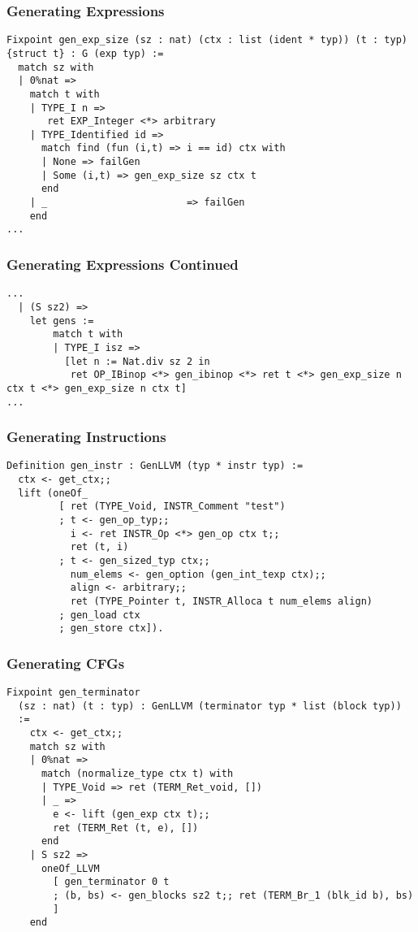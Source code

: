 \documentclass{beamer}
\begin{document}
\begin{frame}
  \frametitle{Generating Expressions}

\begin{lstlisting}[language=SSR]
Fixpoint gen_exp_size (sz : nat) (ctx : list (ident * typ)) (t : typ) {struct t} : G (exp typ) :=
  match sz with
  | 0%nat =>
    match t with
    | TYPE_I n =>
       ret EXP_Integer <*> arbitrary
    | TYPE_Identified id =>
      match find (fun (i,t) => i == id) ctx with
      | None => failGen
      | Some (i,t) => gen_exp_size sz ctx t
      end
    | _                        => failGen
    end
...
\end{lstlisting}
\end{frame}

\begin{frame}
  \frametitle{Generating Expressions Continued}
\begin{lstlisting}[language=SSR]
...
  | (S sz2) =>
    let gens :=
        match t with
        | TYPE_I isz =>
          [let n := Nat.div sz 2 in
           ret OP_IBinop <*> gen_ibinop <*> ret t <*> gen_exp_size n ctx t <*> gen_exp_size n ctx t]
...
\end{lstlisting}
\end{frame}

\begin{frame}[fragile]
  \frametitle{Generating Instructions}
  
\begin{lstlisting}[language=SSR]
Definition gen_instr : GenLLVM (typ * instr typ) :=
  ctx <- get_ctx;;
  lift (oneOf_
         [ ret (TYPE_Void, INSTR_Comment "test")
         ; t <- gen_op_typ;;
           i <- ret INSTR_Op <*> gen_op ctx t;;
           ret (t, i)
         ; t <- gen_sized_typ ctx;;
           num_elems <- gen_option (gen_int_texp ctx);;
           align <- arbitrary;;
           ret (TYPE_Pointer t, INSTR_Alloca t num_elems align)
         ; gen_load ctx
         ; gen_store ctx]).
\end{lstlisting}
\end{frame}

\begin{frame}[fragile]
  \frametitle{Generating CFGs}
\begin{lstlisting}[language=SSR]
Fixpoint gen_terminator
  (sz : nat) (t : typ) : GenLLVM (terminator typ * list (block typ))
  :=
    ctx <- get_ctx;;
    match sz with
    | 0%nat =>
      match (normalize_type ctx t) with
      | TYPE_Void => ret (TERM_Ret_void, [])
      | _ =>
        e <- lift (gen_exp ctx t);;
        ret (TERM_Ret (t, e), [])
      end
    | S sz2 =>
      oneOf_LLVM
        [ gen_terminator 0 t
        ; (b, bs) <- gen_blocks sz2 t;; ret (TERM_Br_1 (blk_id b), bs)
        ]
    end
\end{lstlisting}
\end{frame}
\end{document}
